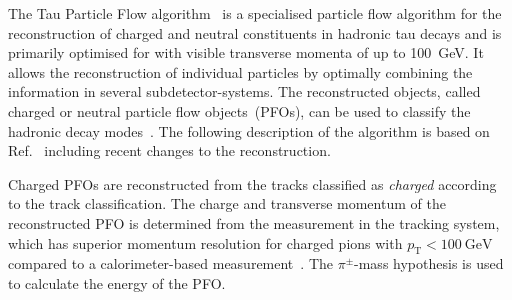 The Tau Particle Flow algorithm~\cite{bwinter, atlas:taurec:decaymodes} is a
specialised particle flow algorithm for the reconstruction of charged and
neutral constituents in hadronic tau decays and is primarily optimised for
\tauhadvis with visible transverse momenta of up to
\SI{100}{\giga\electronvolt}. It allows the reconstruction of individual
particles by optimally combining the information in several subdetector-systems.
The reconstructed objects, called charged or neutral particle flow
objects~(PFOs), can be used to classify the hadronic decay modes~\cite{climbach,
  atlas:taurec:decaymodes}. The following description of the algorithm is based
on Ref.~\cite{atlas:taurec:decaymodes} including recent changes to the
reconstruction.

Charged PFOs are reconstructed from the tracks classified as \emph{charged}
according to the track classification. The charge and transverse momentum of the
reconstructed PFO is determined from the measurement in the tracking system,
which has superior momentum resolution for charged pions with
$p_\text{T} < \SI{100}{\giga\electronvolt}$ compared to a calorimeter-based
measurement~\cite{atlas:taurec:decaymodes}. The $\pi^\pm$-mass hypothesis is
used to calculate the energy of the PFO.

